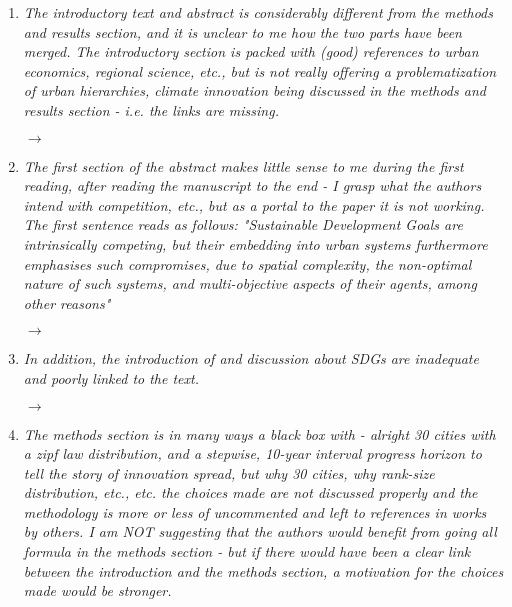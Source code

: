 \documentclass[10pt,a4paper,sans]{moderncv}        %
\begin{document}
\begin{enumerate}
%       
    \item \textit{The introductory text and abstract is considerably different from the methods and results section, and it is unclear to me how the two parts have been merged. The introductory section is packed with (good) references to urban economics, regional science, etc., but is not really offering a problematization of urban hierarchies, climate innovation being discussed in the methods and results section - i.e. the links are missing.}
    
    \medskip

    $\rightarrow$

    \bigskip

    \item \textit{The first section of the abstract makes little sense to me during the first reading, after reading the manuscript to the end - I grasp what the authors intend with competition, etc., but as a portal to the paper it is not working. The first sentence reads as follows: "Sustainable Development Goals are intrinsically competing, but their embedding into urban systems furthermore emphasises such compromises, due to spatial complexity, the non-optimal nature of such systems, and multi-objective aspects of their agents, among other reasons"}
    
    \medskip
    
    $\rightarrow$
    
    \bigskip

    \item \textit{In addition, the introduction of and discussion about SDGs are inadequate and poorly linked to the text.}

    \medskip
    
    $\rightarrow$
    
    \bigskip

    \item \textit{The methods section is in many ways a black box with - alright 30 cities with a zipf law distribution, and a stepwise, 10-year interval progress horizon to tell the story of innovation spread, but why 30 cities, why rank-size distribution, etc., etc. the choices made are not discussed properly and the methodology is more or less of uncommented and left to references in works by others. I am NOT suggesting that the authors would benefit from going all formula in the methods section - but if there would have been a clear link between the introduction and the methods section, a motivation for the choices made would be stronger.}
    

\end{enumerate}
\end{document}

